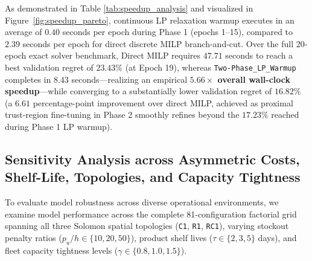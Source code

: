 \documentclass[11pt,a4paper]{article}
\theoremstyle{definition}
\theoremstyle{remark}
\begin{document}
As demonstrated in Table \ref{tab:speedup_analysis} and visualized in Figure~\ref{fig:speedup_pareto}, continuous LP relaxation warmup executes in an average of $0.40$ seconds per epoch during Phase 1 (epochs 1--15), compared to $2.39$ seconds per epoch for direct discrete MILP branch-and-cut. Over the full 20-epoch exact solver benchmark, Direct MILP requires $47.71$ seconds to reach a best validation regret of $23.43\%$ (at Epoch 19), whereas \texttt{Two-Phase\_LP\_Warmup} completes in $8.43$ seconds—realizing an empirical \textbf{$5.66\times$ overall wall-clock speedup}—while converging to a substantially lower validation regret of \textbf{$16.82\%$} (a $6.61$ percentage-point improvement over direct MILP, achieved as proximal trust-region fine-tuning in Phase 2 smoothly refines beyond the $17.23\%$ reached during Phase 1 LP warmup).

\FloatBarrier
\subsection{Sensitivity Analysis across Asymmetric Costs, Shelf-Life, Topologies, and Capacity Tightness}
\label{subsec:sensitivity}
To evaluate model robustness across diverse operational environments, we examine model performance across the complete 81-configuration factorial grid spanning all three Solomon spatial topologies (\texttt{C1}, \texttt{R1}, \texttt{RC1}), varying stockout penalty ratios ($p_u/h \in \{10, 20, 50\}$), product shelf lives ($\tau \in \{2, 3, 5\}$ days), and fleet capacity tightness levels ($\gamma \in \{0.8, 1.0, 1.5\}$). 
\end{document}
